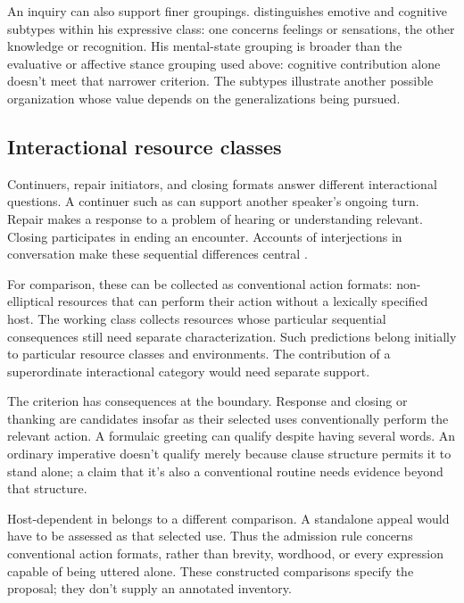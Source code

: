 \documentclass[12pt]{article}
\begin{document}
An inquiry can also support finer groupings. \textcite[113]{ameka1992}
distinguishes emotive and cognitive subtypes within his expressive class:
one concerns feelings or sensations, the other knowledge or recognition.
His mental-state grouping is broader than the evaluative or affective
stance grouping used above: cognitive contribution alone doesn't meet
that narrower criterion. The subtypes illustrate another possible
organization whose value depends on the generalizations being pursued.

\subsection{Interactional resource classes}

Continuers, repair initiators, and closing formats answer different
interactional questions. A continuer such as  can support
another speaker's ongoing turn. Repair  makes a response to
a problem of hearing or understanding relevant. Closing 
participates in ending an encounter. Accounts of interjections in
conversation make these sequential differences central
\citep[257--259, 263--265]{dingemanse2024}.

For comparison, these can be collected as conventional action formats:
non-elliptical resources that can perform their action without a lexically
specified host. The working class collects resources whose particular sequential
consequences still need separate characterization. Such predictions belong initially to
particular resource classes and environments. The contribution of a
superordinate interactional category would need separate support.

The criterion has consequences at the boundary. Response 
and closing or thanking  are candidates insofar as their
selected uses conventionally perform the relevant action. A formulaic
greeting  can qualify despite having several words.
An ordinary imperative  doesn't qualify merely because
clause structure permits it to stand alone; a claim that it's also a
conventional routine needs evidence beyond that structure.

Host-dependent  in  belongs to
a different comparison. A standalone appeal  would have
to be assessed as that selected use. Thus the admission rule concerns
conventional action formats, rather than brevity, wordhood, or every
expression capable of being uttered alone. These constructed comparisons
specify the proposal; they don't supply an annotated inventory.
\end{document}
